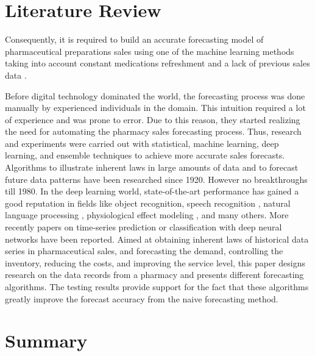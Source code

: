 \documentclass[12pt]{report}
\begin{document}
\section{Literature Review}

Consequently, it is required to build an accurate forecasting model of pharmaceutical preparations sales using one of the machine learning methods taking into account constant medications refreshment and a lack of previous sales data \cite{1}.

Before digital technology dominated the world, the forecasting process was done manually by experienced individuals in the domain. This intuition required a lot of experience and was prone to error. Due to this reason, they started realizing the need for automating the pharmacy sales forecasting process. 
Thus, research and experiments were carried out with statistical, machine learning, deep learning, and ensemble techniques to achieve more accurate sales forecasts. \cite{2}
Algorithms to illustrate inherent laws in large amounts of data and to forecast future data patterns have been researched since 1920. However no breakthroughs till 1980. \cite{3}
In the deep learning world, state-of-the-art performance has gained a good reputation in fields like object recognition, \cite{4} speech recognition \cite{5}, natural language processing \cite{6},
physiological effect modeling \cite{7}, and many others. More recently papers on time-series prediction or classification with deep neural networks have been reported. \cite{8,9,10,11}
Aimed at obtaining inherent laws of historical data series in pharmaceutical sales, and forecasting the demand, controlling the inventory, reducing the costs, and improving the service level, this paper designs research on the data records from a pharmacy and presents different forecasting algorithms. The testing results provide support for the fact that these algorithms greatly improve the forecast accuracy from the naive forecasting method.



\section{Summary}
\end{document}
